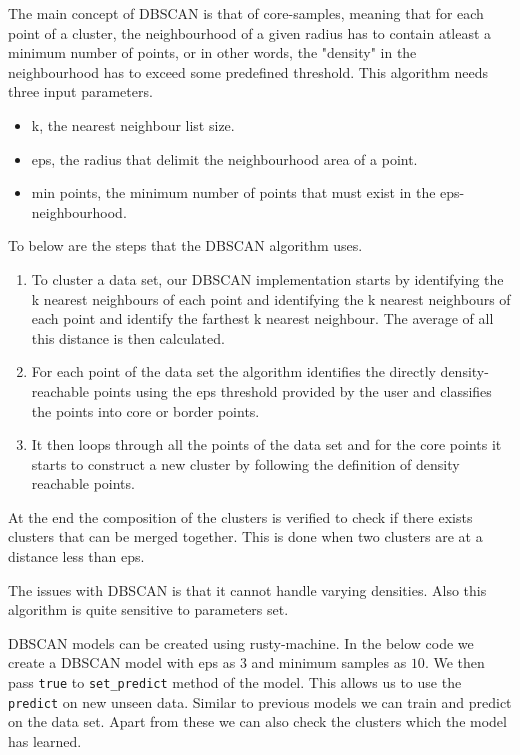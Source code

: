 \documentclass{book}
\begin{document}
The main concept of DBSCAN is that of core-samples, meaning that for each point of a cluster, the neighbourhood of a given radius has to contain atleast a minimum number of points, or in other words, the "density" in the neighbourhood has to exceed some predefined threshold. This algorithm needs three input parameters\cite{UL:9}.

\begin{itemize}
	\item k, the nearest neighbour list size.
	\item eps, the radius that delimit the neighbourhood area of a point.
	\item min points, the minimum number of points that must exist in the eps-neighbourhood.
\end{itemize}

To below are the steps that the DBSCAN algorithm uses.

\begin{enumerate}
	\item To cluster a data set, our DBSCAN implementation starts by identifying the k nearest neighbours of each point and identifying the k nearest neighbours of each point and identify the farthest k nearest neighbour. The average of all this distance is then calculated.
	\item For each point of the data set the algorithm identifies the directly density-reachable points using the eps threshold provided by the user and classifies the points into core or border points.
	\item It then loops through all the points of the data set and for the core points it starts to construct a new cluster by following the definition of density reachable points.
\end{enumerate}

At the end the composition of the clusters is verified to check if there exists clusters that can be merged together. This is done when two clusters are at a distance less than eps.

The issues with DBSCAN is that it cannot handle varying densities. Also this algorithm is quite sensitive to parameters set.

DBSCAN models can be created using rusty-machine. In the below code we create a DBSCAN model with eps as $3$ and minimum samples as $10$. We then pass \lstinline{true} to \lstinline{set_predict} method of the model. This allows us to use the \lstinline{predict} on new unseen data. Similar to previous models we can train and predict on the data set. Apart from these we can also check the clusters which the model has learned.
\end{document}
